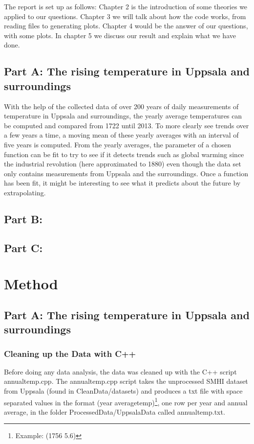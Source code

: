 \documentclass[a4paper]{article}
\begin{document}
The report is set up as follows: Chapter 2 is the introduction of some theories we applied to our questions. Chapter 3 we will talk about how the code works, from reading files to generating plots. Chapter 4 would be the answer of our questions, with some plots. In chapter 5 we discuss our result and explain what we have done.

\subsection{Part A: The rising temperature in Uppsala and surroundings}
With the help of the collected data of over 200 years of daily measurements of temperature in Uppsala and surroundings, the yearly average temperatures can be computed and compared from 1722 until 2013. To more clearly see trends over a few years a time, a moving mean of these yearly averages with an interval of five years is computed.  From the yearly averages, the parameter of a chosen function can be fit to try to see if it detects trends such as global warming since the industrial revolution (here approximated to 1880) even though the data set only contains measurements from Uppsala and the surroundings. Once a function has been fit, it might be interesting to see what it predicts about the future by extrapolating.

\subsection{Part B:}

\subsection{Part C:}


\section{Method}

\subsection{Part A: The rising temperature in Uppsala and surroundings}
\subsubsection{Cleaning up the Data with C++}
Before doing any data analysis, the data was cleaned up with the C++ script annualtemp.cpp. The annualtemp.cpp script takes the unprocessed SMHI dataset from Uppsala (found in CleanData/datasets) and produces a txt file with space separated values in the format (year averagetemp)\footnote{Example: (1756 5.6)}, one row per year and annual average, in the folder ProcessedData/UppsalaData called annualtemp.txt. 
\end{document}
